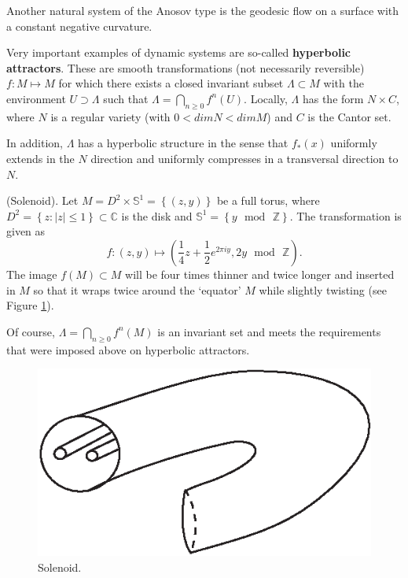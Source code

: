 Another natural system of the Anosov type is the geodesic flow on a surface with a constant negative curvature.

Very important examples of dynamic systems are so-called \textbf{hyperbolic attractors}. These are smooth transformations (not necessarily reversible) $f:M\longmapsto M$ for which there exists a closed invariant subset $\Lambda \subset M$ with the environment $U\supset \Lambda $ such that $\Lambda =\bigcap_{n\geq 0}f^{n}(U)$. Locally, $\Lambda $ has the form $N\times C$, where $N$ is a regular variety (with $0 <dim N <dim M$) and $C$ is the Cantor set.

In addition, $\Lambda$ has a hyperbolic structure in the sense that $f_{\ast }(x)$ uniformly extends in the $N$ direction and uniformly compresses in a transversal direction to $N$.

\begin{example}(Solenoid).
	Let $M=D^{2}\times \mathbb{S}%
	^{1}=\left\{ \left( z,y\right) \right\}$ be a full torus, where $D^{2}=\left\{ z:\left\vert z\right\vert \leq 1\right\} \subset \mathbb{C}$ is the disk and $\mathbb{S}^{1}=\left\{ y\text{ }\textrm{mod}\text{ }\mathbb{Z}%
	\right\} $. The transformation is given as$$
	f:\left( z,y\right) \longmapsto \left( \frac{1}{4}z+\frac{1}{2}e^{2\pi iy},2y%
	\text{ }\textrm{mod}\text{ }\mathbb{Z}\right) .
	$$
	The image $f(M)\subset M$ will be four times thinner and twice longer and inserted in $M$ so that it wraps twice around the `equator' $M$ while slightly twisting (see Figure \ref{fig:5.11}).
	
	Of course, $\Lambda =\bigcap_{n\geq 0}f^{n}(M)$ is an invariant set and meets the requirements that were imposed above on hyperbolic attractors.
\end{example}

\begin{figure}[!ht]
	\centering
	\includegraphics [scale=1.4]{jtr511}
	\caption{Solenoid.}
	\label{fig:5.11}
\end{figure}

